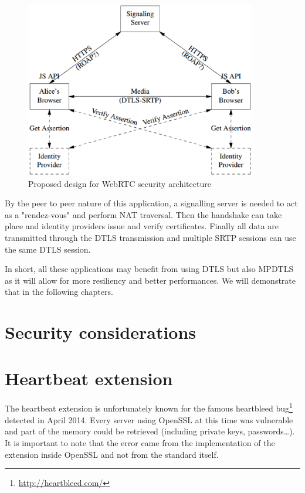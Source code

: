 \begin{figure}[!ht]
\centering
\includegraphics[width=0.9\textwidth]{images/webrtc.eps}
\caption{Proposed design for WebRTC security architecture}
\label{fig:webrtc}
\end{figure}

By the peer to peer nature of this application, a signalling server is needed to act as a "rendez-vous" and perform NAT traversal. Then the handshake can take place and identity providers issue and verify certificates. Finally all data are transmitted through the DTLS transmission and multiple SRTP sessions can use the same DTLS session. 


In short, all these applications may benefit from using DTLS but also MPDTLS as it will allow for more resiliency and better performances. We will demonstrate that in the following chapters.

\section{Security considerations}


\section{Heartbeat extension}

The heartbeat extension is unfortunately known for the famous heartbleed bug\footnote{\url{http://heartbleed.com/}} detected in April 2014. Every server using OpenSSL at this time was vulnerable and part of the memory could be retrieved (including private keys, passwords\dots). It is important to note that the error came from the implementation of the extension inside OpenSSL and not from the standard itself.

